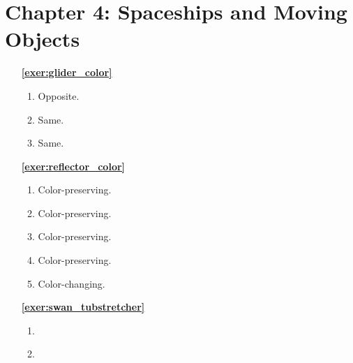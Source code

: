 \hypertarget{solutions_spaceships}{}\label{solutions_spaceships}
\section*{Chapter 4: Spaceships and Moving Objects}
\renewcommand{\chapterfolder}{spaceships/}

\begin{multicols}{2}
\begin{itemize}[leftmargin=0em]
	\item[\bf\color{ocre}\sffamily\ref{exer:glider_color}]
		\begin{enumerate}[leftmargin=1.5em,label=\bf\color{ocre}(\alph*)]
			\item Opposite.
			
			\item Same.
			
			\item Same. \\
		\end{enumerate}
		
	
	\item[\bf\color{ocre}\sffamily\ref{exer:reflector_color}]
		\begin{enumerate}[leftmargin=1.5em,label=(\alph*),series=solu_reflector_color]
			\item Color-preserving.
			
			\item Color-preserving.
			
			\item Color-preserving.
			
			\item Color-preserving.
			
			\item Color-changing. \\
		\end{enumerate}
		
	
	\item[\bf\color{ocre}\sffamily\ref{exer:swan_tubstretcher}]
		\begin{enumerate}[leftmargin=1.5em,label=\bf\color{ocre}(\alph*)]
			\item {}
			
			\item {} \\
		\end{enumerate}
		


\end{itemize}
\end{multicols}
